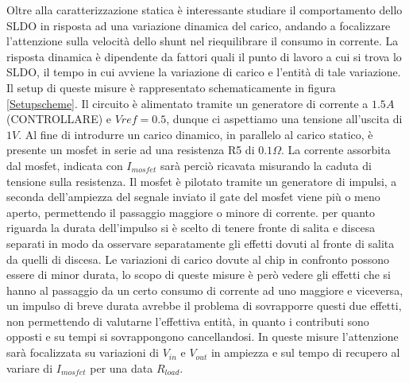 Oltre alla caratterizzazione statica è interessante studiare il comportamento dello SLDO in risposta ad una variazione dinamica del carico, andando a focalizzare l'attenzione sulla velocità dello shunt nel riequilibrare il consumo in corrente. La risposta dinamica è dipendente da fattori quali il punto di lavoro a cui si trova lo SLDO, il tempo in cui avviene la variazione di carico e l'entità di tale variazione.
Il setup di queste misure è rappresentato schematicamente in figura \ref{Setupscheme}. Il circuito è alimentato tramite un generatore di corrente a $1.5A$ (CONTROLLARE) e $Vref=0.5 $, dunque ci aspettiamo una tensione all'uscita di $1V$. Al fine di introdurre un carico dinamico, in parallelo al carico statico, è presente un mosfet in serie ad una resistenza R5 di $0.1 \Omega$.
La corrente assorbita dal mosfet, indicata con $I_{mosfet}$ sarà perciò ricavata misurando la caduta di tensione sulla resistenza. Il mosfet è pilotato tramite un generatore di impulsi, a seconda dell'ampiezza del segnale inviato il gate del mosfet viene più o meno aperto, permettendo il passaggio maggiore o minore di corrente.
per quanto riguarda la durata dell'impulso si è scelto di tenere fronte di salita e discesa separati in modo da osservare separatamente gli effetti dovuti al fronte di salita da quelli di discesa. 
Le variazioni di carico dovute al chip in confronto possono essere di minor durata, lo scopo di queste misure è però vedere gli effetti che si hanno al passaggio da un certo consumo di corrente ad uno maggiore e viceversa, un impulso di breve durata avrebbe il problema di sovrapporre questi due effetti, non permettendo di valutarne l'effettiva entità, in quanto i contributi sono opposti e su tempi si sovrappongono cancellandosi.
In queste misure l'attenzione sarà focalizzata su variazioni di $V_{in}$ e $V_{out}$ in ampiezza e sul tempo di recupero al variare di $I_{mosfet}$ per una data $R_{load}$.

